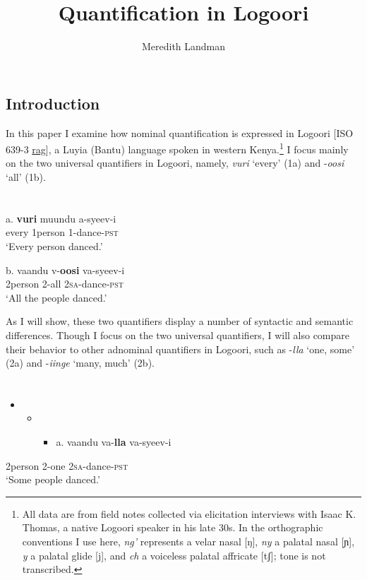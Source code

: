 \documentclass[output=paper]{langsci/langscibook}
\title{Quantification in Logoori}
\author{%
 Meredith Landman \affiliation{Pomona College} 
}
\begin{document}
 
 

\section{ Introduction}

In this paper I examine how nominal quantification is expressed in Logoori [ISO 639-3 \href{http://www-01.sil.org/iso639-3/documentation.asp?id=rag}{rag}], a Luyia (Bantu) language spoken in western Kenya.\footnote{ All data are from field notes collected via elicitation interviews with Isaac K. Thomas, a native Logoori speaker in his late 30s. In the orthographic conventions I use here, \textit{ng'} represents a velar nasal [ŋ], \textit{ny} a palatal nasal [ɲ], \textit{y} a palatal glide [j], and \textit{ch} a voiceless palatal affricate [tʃ]; tone is not transcribed.
} I focus mainly on the two universal quantifiers in Logoori, namely, \textit{vuri} ‘every’ (1a) and -\textit{oosi} ‘all’ (1b).

\chapter{}
\gll \textup{a.  }\textbf{vuri}  muundu  a-syeev-i\\
     every  1person  1-dance-\textsc{pst}\\
\glt ‘Every person danced.’
\z

\gll \textup{b.}   vaandu  v-\textbf{oosi}    va-syeev-i\\
     2person  2-all    2\textsc{sa}{}-dance-\textsc{pst}\\
\glt ‘All the people danced.’
\z

As I will show, these two quantifiers display a number of syntactic and semantic differences. Though I focus on the two universal quantifiers, I will also compare their behavior to other adnominal quantifiers in Logoori, such as -\textit{lla} ‘one, some’ (2a) and -\textit{iinge} ‘many, much’ (2b).

\chapter{}
\setcounter{itemize}{0}
\begin{itemize}
\item \setcounter{itemize}{0}
\begin{itemize}
\item \setcounter{itemize}{0}
\begin{itemize}
\item \gll \textup{   a.   }vaandu  va-\textbf{lla}    va-syeev-i\\
\end{itemize}
\end{itemize}
\end{itemize}
     2person  2-one    2\textsc{sa}{}-dance-\textsc{pst}\\
\glt ‘Some people danced.’
\z
\end{document}
